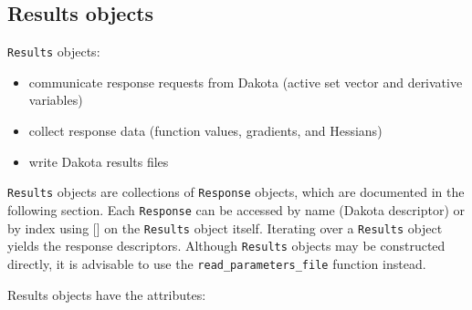 \subsection{Results objects}

{\tt Results} objects:
\begin{itemize}

  \item communicate response requests from Dakota (active set vector and derivative variables)
  \item collect response data (function values, gradients, and Hessians)
  \item write Dakota results files
\end{itemize}

{\tt Results} objects are collections of {\tt Response} objects, which are documented in the following section. Each {\tt Response} can be accessed by name (Dakota descriptor) or by index using {[}{]} on the {\tt Results} object itself. Iterating over a {\tt Results} object yields the response descriptors. Although {\tt Results} objects may be constructed directly, it is advisable to use the {\tt read\_parameters\_file} function instead.

Results objects have the attributes:

